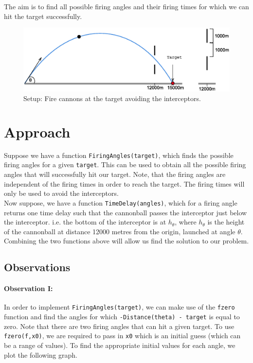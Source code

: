 \documentclass[11pt]{report}
\begin{document}
The aim is to find all possible firing angles and their firing times for which we can hit the target successfully.
\begin{figure}[h]
	\centering
  	\includegraphics[scale=0.75]{assets/target.eps}
  	\caption{Setup: Fire cannons at the target avoiding the interceptors.}
  	\label{fig:target}
\end{figure}
\section{Approach}
Suppose we have a function \texttt{FiringAngles(target)}, which finds the possible firing angles for a given \texttt{target}. This can be used to obtain all the possible firing angles that will successfully hit our target. Note, that the firing angles are independent of the firing times in order to reach the target. The firing times will only be used to avoid the interceptors. \\

Now suppose, we have a function \texttt{TimeDelay(angles)}, which for a firing angle returns one time delay such that the cannonball passes the interceptor just below the interceptor. i.e. the bottom of the interceptor is at $h_{\theta}$, where $h_{\theta}$ is the height of the cannonball at distance 12000 metres from the origin, launched at angle $\theta$. \\

Combining the two functions above will allow us find the solution to our problem.

\subsection{Observations}
\paragraph{Observation I:}
In order to implement \texttt{FiringAngles(target)}, we can make use of the \texttt{fzero} function and find the angles for which \texttt{-Distance(theta) - target} is equal to zero. Note that there are two firing angles that can hit a given target. To use \texttt{fzero(f,x0)}, we are required to pass in \texttt{x0} which is an initial guess (which can be a range of values). To find the appropriate initial values for each angle, we plot the following graph.
\end{document}
